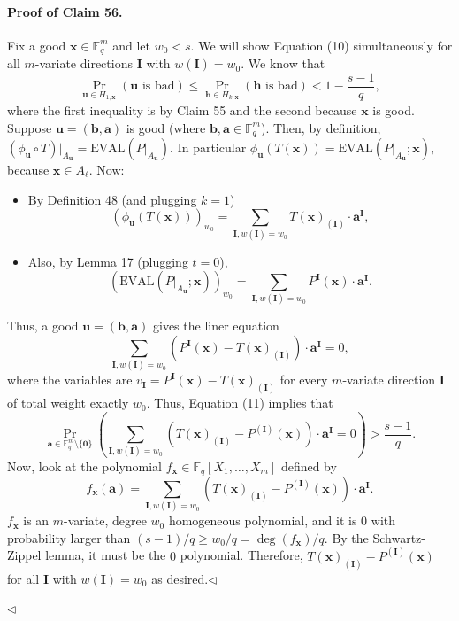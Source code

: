 \documentclass[10pt,a4paper]{article}
\begin{document}
\paragraph{Proof of Claim 56.} Fix a good $\boldsymbol x\in\mathbb F_q^m$ and let $w_0<s$. We will show Equation (10) simultaneously for all $m$-variate directions $\boldsymbol I$ with $w(\boldsymbol I)=w_0$. We know that
\[\Pr_{\boldsymbol u\in H_{1,\boldsymbol x}}(\boldsymbol u\text{ is bad})\leq\Pr_{\boldsymbol h\in H_{k,\boldsymbol x}}(\boldsymbol h\text{ is bad})<1-\frac{s-1}q,\tag{11}\]
where the first inequality is by Claim 55 and the second because $\boldsymbol x$ is good.
Suppose $\boldsymbol u=(\boldsymbol b,\boldsymbol a)$ is good (where $\boldsymbol b,\boldsymbol a\in\mathbb F_q^m$). Then, by definition, $(\phi_{\boldsymbol u}\circ T)|_{A_{\boldsymbol u}}=\mathrm{EVAL}(P|_{A_{\boldsymbol u}})$. In particular $\phi_{\boldsymbol u}(T(\boldsymbol x))=\mathrm{EVAL}(P|_{A_{\boldsymbol u}};\boldsymbol x)$, because $\boldsymbol x\in A_\ell$. Now:
\begin{itemize}
\item By Definition 48 (and plugging $k=1$)
\[(\phi_{\boldsymbol u}(T(\boldsymbol x)))_{w_0}=\sum_{\boldsymbol I,w(\boldsymbol I)=w_0}T(\boldsymbol x)_{(\boldsymbol I)}\cdot\boldsymbol a^{\boldsymbol I},\]
\item Also, by Lemma 17 (plugging $t=0$),
\[(\mathrm{EVAL}(P|_{A_{\boldsymbol u}};\boldsymbol x))_{w_0}=\sum_{\boldsymbol I,w(\boldsymbol I)=w_0}P^{\boldsymbol I}(\boldsymbol x)\cdot\boldsymbol a^{\boldsymbol I}.\]
\end{itemize}
Thus, a good $\boldsymbol u=(\boldsymbol b,\boldsymbol a)$ gives the liner equation
\[\sum_{\boldsymbol I,w(\boldsymbol I)=w_0}(P^{\boldsymbol I}(\boldsymbol x)-T(\boldsymbol x)_{(\boldsymbol I)})\cdot\boldsymbol a^{\boldsymbol I}=0,\]
where the variables are $v_{\boldsymbol I}=P^{\boldsymbol I}(\boldsymbol x)-T(\boldsymbol x)_{(\boldsymbol I)}$ for every $m$-variate direction $\boldsymbol I$ of total weight exactly $w_0$. Thus, Equation (11) implies that
\[\Pr_{\boldsymbol a\in\mathbb F_q^m\setminus\{\boldsymbol0\}}\left(\sum_{\boldsymbol I,w(\boldsymbol I)=w_0}(T(\boldsymbol x)_{(\boldsymbol I)}-P^{(\boldsymbol I)}(\boldsymbol x))\cdot\boldsymbol a^{\boldsymbol I}=0\right)>\frac{s-1}q.\]
Now, look at the polynomial $f_{\boldsymbol x}\in\mathbb F_q[X_1,\ldots,X_m]$ defined by
\[f_{\boldsymbol x}(\boldsymbol a)=\sum_{\boldsymbol I,w(\boldsymbol I)=w_0}(T(\boldsymbol x)_{(\boldsymbol I)}-P^{(\boldsymbol I)}(\boldsymbol x))\cdot\boldsymbol a^{\boldsymbol I}.\]
$f_{\boldsymbol x}$ is an $m$-variate, degree $w_0$ homogeneous polynomial, and it is $0$ with probability larger than $(s-1)/q\geq w_0/q=\deg(f_{\boldsymbol x})/q$. By the Schwartz-Zippel lemma, it must be the $0$ polynomial. Therefore, $T(\boldsymbol x)_{(\boldsymbol I)}-P^{(\boldsymbol I)}(\boldsymbol x)$ for all $\boldsymbol I$ with $w(\boldsymbol I)=w_0$ as desired.\hfill$\triangleleft$\par\hfill$\triangleleft$
\end{document}
